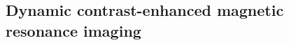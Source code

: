 
\subsection{Dynamic contrast-enhanced magnetic resonance imaging}\label{subsection:stateart:dce}


